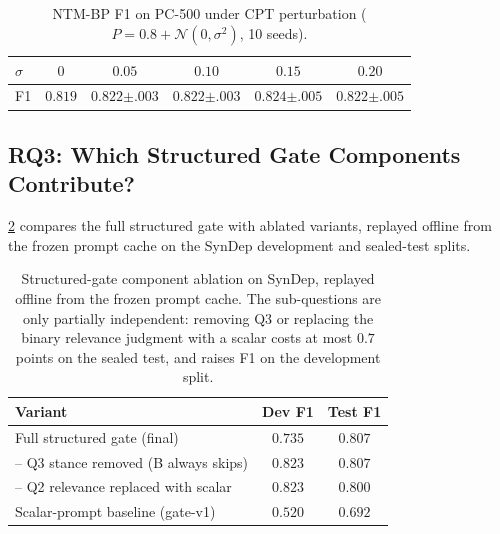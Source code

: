 \documentclass{article}
\theoremstyle{definition}
\begin{document}
\begin{table}[t]
\centering
\caption{NTM-BP F1 on PC-500 under CPT perturbation
  ($P=0.8+\mathcal{N}(0,\sigma^2)$, 10 seeds).}
\label{tab:cpt-noise}
\begin{tabular}{lccccc}
\toprule
$\sigma$ & $0$ & $0.05$ & $0.10$ & $0.15$ & $0.20$ \\
\midrule
F1 & $0.819$ & $0.822{\scriptstyle\pm.003}$ & $0.822{\scriptstyle\pm.003}$
   & $0.824{\scriptstyle\pm.005}$ & $0.822{\scriptstyle\pm.005}$ \\
\bottomrule
\end{tabular}
\end{table}

\subsection{RQ3: Which Structured Gate Components Contribute?}
\label{sec:rq3}

\cref{tab:ablation} compares the full structured gate with ablated
variants, replayed offline from the frozen prompt cache on the SynDep
development and sealed-test splits.

\begin{table}[t]
\centering
\caption{Structured-gate component ablation on SynDep, replayed offline
from the frozen prompt cache.  The sub-questions are only partially
independent: removing Q3 or replacing the binary relevance judgment with a
scalar costs at most $0.7$ points on the sealed test, and raises F1 on the
development split.}
\label{tab:ablation}
\begin{tabular}{lcc}
\toprule
Variant & Dev F1 & Test F1 \\
\midrule
Full structured gate (final)                    & $0.735$ & $\mathbf{0.807}$ \\
\quad-- Q3 stance removed (B always skips)      & $0.823$ & $0.807$ \\
\quad-- Q2 relevance replaced with scalar       & $0.823$ & $0.800$ \\
Scalar-prompt baseline (gate-v1)                & $0.520$ & $0.692$ \\
\bottomrule
\end{tabular}
\end{table}
\end{document}
